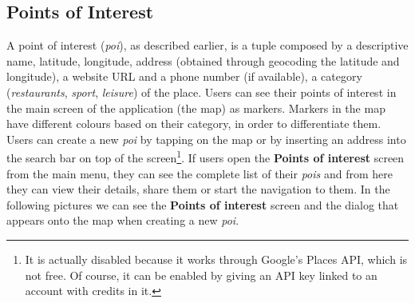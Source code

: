 \documentclass[../../main]{subfiles}
\begin{document}
\subsection{Points of Interest}
\label{ss:final-poi}

A point of interest (\textit{poi}), as described earlier, is a tuple composed by a descriptive name, latitude, longitude, address (obtained through geocoding the latitude and longitude), a website URL and a phone number (if available), a category (\textit{restaurants}, \textit{sport}, \textit{leisure}) of the place.
Users can see their points of interest in the main screen of the application (the map) as markers.
Markers in the map have different colours based on their category, in order to differentiate them.
Users can create a new \textit{poi} by tapping on the map or by inserting an address into the search bar on top of the screen\footnote{It is actually disabled because it works through Google's Places API, which is not free. Of course, it can be enabled by giving an API key linked to an account with credits in it.}.
If users open the \textbf{Points of interest} screen from the main menu, they can see the complete list of their \textit{pois} and from here they can view their details, share them or start the navigation to them.
In the following pictures we can see the \textbf{Points of interest} screen and the dialog that appears onto the map when creating a new \textit{poi}.
\end{document}
